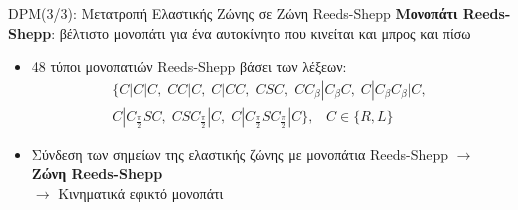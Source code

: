 \documentclass[10pt, compress, handout]{beamer} %
\begin{document}
\begin{frame}{DPM(3/3): Μετατροπή Ελαστικής Ζώνης σε Ζώνη Reeds-Shepp}
\textbf{Μονοπάτι Reeds-Shepp}: βέλτιστο μονοπάτι για ένα αυτοκίνητο που κινείται και μπρος και πίσω
	\begin{itemize}
		\item 48 τύποι μονοπατιών Reeds-Shepp βάσει των λέξεων:\\[-0.8cm] 
			\begin{align*}
	\{C|C|C,\;CC|C,\;C|CC,\;CSC,\;CC_{\beta}|C_{\beta}C,\;	C|C_{\beta}C_{\beta}|C,\;\nonumber\\C|C_{\frac{\pi}{2}}SC,\;CSC_{\frac{\pi}{2}}|C,\;C|C_{\frac{\pi}{2}}SC_{\frac{\pi}2}|C\},\;\;\; C \in \{R,L\}
			\end{align*}

		\item Σύνδεση των σημείων της ελαστικής ζώνης με μονοπάτια Reeds-Shepp
		$\rightarrow$ \textbf{Ζώνη Reeds-Shepp}\\
		$\rightarrow$ Κινηματικά εφικτό μονοπάτι
	\end{itemize}
	\vspace{-0.5cm}
	\begin{figure}
		\captionsetup[subfigure]{labelformat=empty}
		 \hspace{0.1cm}
		 \hspace{0.1cm}
	\end{figure}
\end{frame}
\end{document}
